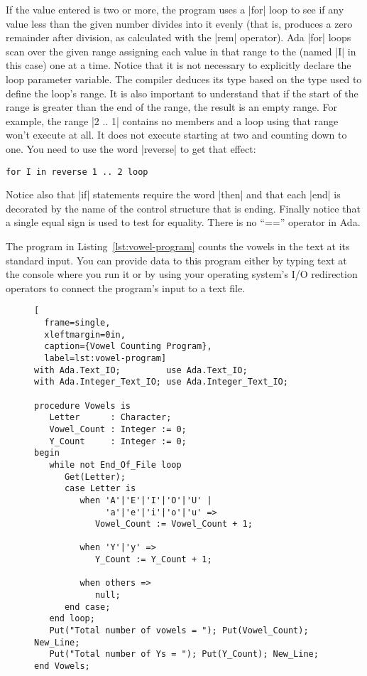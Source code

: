 If the value entered is two or more, the program uses a |for| loop to see if any value less than
the given number divides into it evenly (that is, produces a zero remainder after division, as
calculated with the |rem| operator). Ada |for| loops scan over the given range assigning each
value in that range to the  (named |I| in this case) one at a
time. Notice that it is not necessary to explicitly declare the loop parameter variable. The
compiler deduces its type based on the type used to define the loop's range. It is also
important to understand that if the start of the range is greater than the end of the range, the
result is an empty range. For example, the range |2 .. 1| contains no members and a loop using
that range won't execute at all. It does not execute starting at two and counting down to one.
You need to use the word |reverse| to get that effect:

\begin{lstlisting}
for I in reverse 1 .. 2 loop
\end{lstlisting}

Notice also that |if| statements require the word |then| and that each |end| is decorated by the
name of the control structure that is ending. Finally notice that a single equal sign is used to
test for equality. There is no ``=='' operator in Ada.

The program in Listing~\ref{lst:vowel-program} counts the vowels in the text at its standard
input. You can provide data to this program either by typing text at the console where you run
it or by using your operating system's I/O redirection operators to connect the program's input
to a text file.

\begin{figure}[tbhp]
\begin{lstlisting}[
  frame=single,
  xleftmargin=0in,
  caption={Vowel Counting Program},
  label=lst:vowel-program]
with Ada.Text_IO;         use Ada.Text_IO;
with Ada.Integer_Text_IO; use Ada.Integer_Text_IO;

procedure Vowels is
   Letter      : Character;
   Vowel_Count : Integer := 0;
   Y_Count     : Integer := 0;
begin
   while not End_Of_File loop
      Get(Letter);
      case Letter is
         when 'A'|'E'|'I'|'O'|'U' |
              'a'|'e'|'i'|'o'|'u' =>
            Vowel_Count := Vowel_Count + 1;
            
         when 'Y'|'y' =>
            Y_Count := Y_Count + 1;
            
         when others =>
            null;
      end case;
   end loop;
   Put("Total number of vowels = "); Put(Vowel_Count); New_Line;
   Put("Total number of Ys = "); Put(Y_Count); New_Line;
end Vowels;
\end{lstlisting}
\end{figure}

